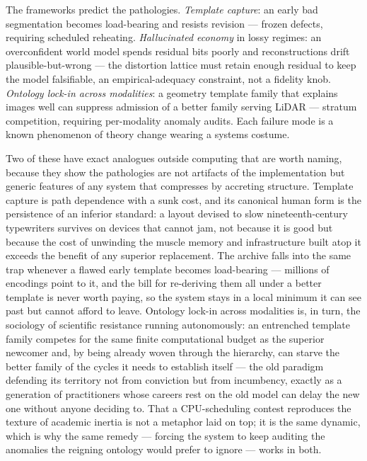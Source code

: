 \documentclass[11pt,oneside]{book}
\theoremstyle{remark}
\begin{document}
The frameworks predict the pathologies. \emph{Template capture}: an
early bad segmentation becomes load-bearing and resists revision ---
frozen defects, requiring scheduled reheating. \emph{Hallucinated
economy} in lossy regimes: an overconfident world model spends residual
bits poorly and reconstructions drift plausible-but-wrong --- the
distortion lattice must retain enough residual to keep the model
falsifiable, an empirical-adequacy constraint, not a fidelity knob.
\emph{Ontology lock-in across modalities}: a geometry template family
that explains images well can suppress admission of a better family
serving LiDAR --- stratum competition, requiring per-modality anomaly
audits. Each failure mode is a known phenomenon of theory change wearing
a systems costume.

Two of these have exact analogues outside computing that are worth
naming, because they show the pathologies are not artifacts of the
implementation but generic features of any system that compresses by
accreting structure. Template capture is path dependence with a sunk
cost, and its canonical human form is the persistence of an inferior
standard: a layout devised to slow nineteenth-century typewriters
survives on devices that cannot jam, not because it is good but because
the cost of unwinding the muscle memory and infrastructure built atop it
exceeds the benefit of any superior replacement. The archive falls into
the same trap whenever a flawed early template becomes load-bearing ---
millions of encodings point to it, and the bill for re-deriving them all
under a better template is never worth paying, so the system stays in a
local minimum it can see past but cannot afford to leave. Ontology
lock-in across modalities is, in turn, the sociology of scientific
resistance running autonomously: an entrenched template family competes
for the same finite computational budget as the superior newcomer and,
by being already woven through the hierarchy, can starve the better
family of the cycles it needs to establish itself --- the old paradigm
defending its territory not from conviction but from incumbency, exactly
as a generation of practitioners whose careers rest on the old model can
delay the new one without anyone deciding to. That a CPU-scheduling
contest reproduces the texture of academic inertia is not a metaphor
laid on top; it is the same dynamic, which is why the same remedy ---
forcing the system to keep auditing the anomalies the reigning ontology
would prefer to ignore --- works in both.
\end{document}
